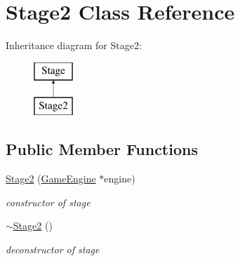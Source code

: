 \hypertarget{class_stage2}{
\section{Stage2 Class Reference}
\label{class_stage2}
}
Inheritance diagram for Stage2:\begin{figure}[H]
\begin{center}
\leavevmode
\includegraphics[height=2.000000cm]{class_stage2}
\end{center}
\end{figure}
\subsection*{Public Member Functions}
\begin{DoxyCompactItemize}
\item 
\hypertarget{class_stage2_ae1006f61adff15b7812c3724311ee5c6}{
\hyperlink{class_stage2_ae1006f61adff15b7812c3724311ee5c6}{Stage2} (\hyperlink{class_game_engine}{GameEngine} $\ast$engine)}
\label{class_stage2_ae1006f61adff15b7812c3724311ee5c6}

\begin{DoxyCompactList}\small\item\em constructor of stage \end{DoxyCompactList}\item 
\hypertarget{class_stage2_ae940ae981513df433065c59edd97e27c}{
\hyperlink{class_stage2_ae940ae981513df433065c59edd97e27c}{$\sim$Stage2} ()}
\label{class_stage2_ae940ae981513df433065c59edd97e27c}

\begin{DoxyCompactList}\small\item\em deconstructor of stage \end{DoxyCompactList}\end{DoxyCompactItemize}
